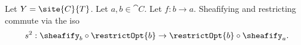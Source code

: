 \begin{corollary}
Let $Y = \site{C}{T}$.
Let $a,b \in \cat{C}$.
Let $f: b\rightarrow a$.
Sheafifying and restricting commute via the iso
\[s^2: \sheafify_b \circ \restrictOpt{b} \rightarrow \restrictOpt{b} \circ \sheafify_a.\]
\end{corollary}










